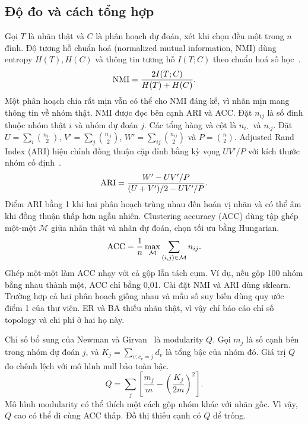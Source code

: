 \subsection{Độ đo và cách tổng hợp}
Gọi $T$ là nhãn thật và $C$ là phân hoạch dự đoán, xét khi chọn đều một trong $n$ đỉnh. Độ tương hỗ chuẩn hoá (normalized mutual information, NMI) dùng entropy $H(T),H(C)$ và thông tin tương hỗ $I(T;C)$ theo chuẩn hoá số học~\cite{danon}.
\begin{equation}
 \mathrm{NMI} = \frac{2I(T;C)}{H(T)+H(C)}.
 \label{eq:nmi}
\end{equation}
Một phân hoạch chia rất mịn vẫn có thể cho NMI đáng kể, vì nhãn mịn mang thông tin về nhóm thật. NMI được đọc bên cạnh ARI và ACC. Đặt $n_{ij}$ là số đỉnh thuộc nhóm thật $i$ và nhóm dự đoán $j$. Các tổng hàng và cột là $n_{i\cdot}$ và $n_{\cdot j}$. Đặt $U=\sum_i{n_{i\cdot}\choose2}$, $V'=\sum_j{n_{\cdot j}\choose2}$, $W'=\sum_{ij}{n_{ij}\choose2}$ và $P={n\choose2}$. Adjusted Rand Index (ARI) hiệu chỉnh đồng thuận cặp đỉnh bằng kỳ vọng $UV'/P$ với kích thước nhóm cố định~\cite{hubert}.
\begin{equation}
 \mathrm{ARI}=\frac{W'-UV'/P}{(U+V')/2-UV'/P}.
 \label{eq:ari}
\end{equation}
Điểm ARI bằng 1 khi hai phân hoạch trùng nhau đến hoán vị nhãn và có thể âm khi đồng thuận thấp hơn ngẫu nhiên. Clustering accuracy (ACC) dùng tập ghép một-một $\mathcal M$ giữa nhãn thật và nhãn dự đoán, chọn tối ưu bằng Hungarian.
\begin{equation}
 \mathrm{ACC}=\frac{1}{n}\max_{\mathcal M}\sum_{(i,j)\in\mathcal M}n_{ij}.
 \label{eq:acc}
\end{equation}
Ghép một-một làm ACC nhạy với cả gộp lẫn tách cụm. Ví dụ, nếu gộp 100 nhóm bằng nhau thành một, ACC chỉ bằng 0,01. Cài đặt NMI và ARI dùng sklearn. Trường hợp cả hai phân hoạch giống nhau và mẫu số suy biến dùng quy ước điểm 1 của thư viện. ER và BA thiếu nhãn thật, vì vậy chỉ báo cáo chỉ số topology và chi phí ở hai họ này.

Chỉ số bổ sung của Newman và Girvan~\cite{newman} là modularity $Q$. Gọi $m_j$ là số cạnh bên trong nhóm dự đoán $j$, và $K_j=\sum_{v:c_v=j}d_v$ là tổng bậc của nhóm đó. Giá trị $Q$ đo chênh lệch với mô hình null bảo toàn bậc.
\begin{equation}
 Q=\sum_j\left[\frac{m_j}{m}-\left(\frac{K_j}{2m}\right)^2\right].
 \label{eq:modularity}
\end{equation}
Mô hình modularity có thể thích một cách gộp nhóm khác với nhãn gốc. Vì vậy, $Q$ cao có thể đi cùng ACC thấp. Đồ thị thiếu cạnh có $Q$ để trống.

